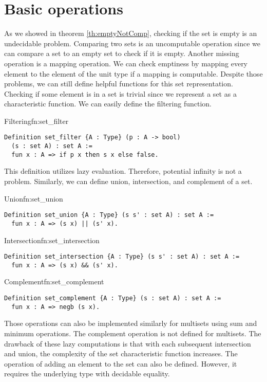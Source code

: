 \section{Basic operations}
As we showed in theorem \ref{th:emptyNotComp}, checking if the set is empty is an undecidable problem. Comparing two sets is an uncomputable operation since we can compare a set to an empty set to check if it is empty. Another missing operation is a mapping operation. We can check emptiness by mapping every element to the element of the unit type if a mapping is computable. Despite those problems, we can still define helpful functions for this set representation. Checking if some element is in a set is trivial since we represent a set as a characteristic function. We can easily define the filtering function.
\begin{func}{Filtering}{fn:set_filter}
\begin{verbatim}
Definition set_filter {A : Type} (p : A -> bool) 
  (s : set A) : set A :=
  fun x : A => if p x then s x else false.
\end{verbatim}
\end{func}
This definition utilizes lazy evaluation. Therefore, potential infinity is not a problem. Similarly, we can define union, intersection, and complement of a set.
\begin{func}{Union}{fn:set_union}
\begin{verbatim}
Definition set_union {A : Type} (s s' : set A) : set A :=
  fun x : A => (s x) || (s' x).
\end{verbatim}
\end{func}
\begin{func}{Intersection}{fn:set_intersection}
\begin{verbatim}
Definition set_intersection {A : Type} (s s' : set A) : set A :=
  fun x : A => (s x) && (s' x).
\end{verbatim}
\end{func}
\begin{func}{Complement}{fn:set_complement}
\begin{verbatim}
Definition set_complement {A : Type} (s : set A) : set A :=
  fun x : A => negb (s x).
\end{verbatim}
\end{func}
Those operations can also be implemented similarly for multisets using sum and minimum operations. The complement operation is not defined for multisets. The drawback of these lazy computations is that with each subsequent intersection and union, the complexity of the set characteristic function increases. The operation of adding an element to the set can also be defined. However, it requires the underlying type with decidable equality.
